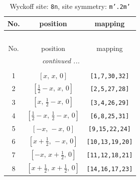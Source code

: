 \documentclass[fleqn,8pt]{jsarticle}
\begin{document}
\begin{longtable}{ccc}
\caption{Wyckoff site: {\tt 8n}, site symmetry: {\tt m'.2m'}}
 \\
 \hline \hline
No. & position & mapping \\ \hline \endfirsthead

\multicolumn{2}{l}{\tablename\ \thetable{}} \\
 \hline \hline
No. & position & mapping \\ \hline \endhead

 \hline \hline
\multicolumn{2}{r}{\footnotesize\it continued ...} \\ \endfoot

 \hline \hline
\multicolumn{2}{r}{} \\ \endlastfoot

1 & $\left[ x,\, x,\, 0 \right]$ & {\tt [1,7,30,32]} \\ \hline
2 & $\left[ \frac{1}{2} - x,\, x,\, 0 \right]$ & {\tt [2,5,27,28]} \\ \hline
3 & $\left[ x,\, \frac{1}{2} - x,\, 0 \right]$ & {\tt [3,4,26,29]} \\ \hline
4 & $\left[ \frac{1}{2} - x,\, \frac{1}{2} - x,\, 0 \right]$ & {\tt [6,8,25,31]} \\ \hline
5 & $\left[ - x,\, - x,\, 0 \right]$ & {\tt [9,15,22,24]} \\ \hline
6 & $\left[ x + \frac{1}{2},\, - x,\, 0 \right]$ & {\tt [10,13,19,20]} \\ \hline
7 & $\left[ - x,\, x + \frac{1}{2},\, 0 \right]$ & {\tt [11,12,18,21]} \\ \hline
8 & $\left[ x + \frac{1}{2},\, x + \frac{1}{2},\, 0 \right]$ & {\tt [14,16,17,23]} \\
\end{longtable}
\renewcommand{\arraystretch}{1.2}
\end{document}
